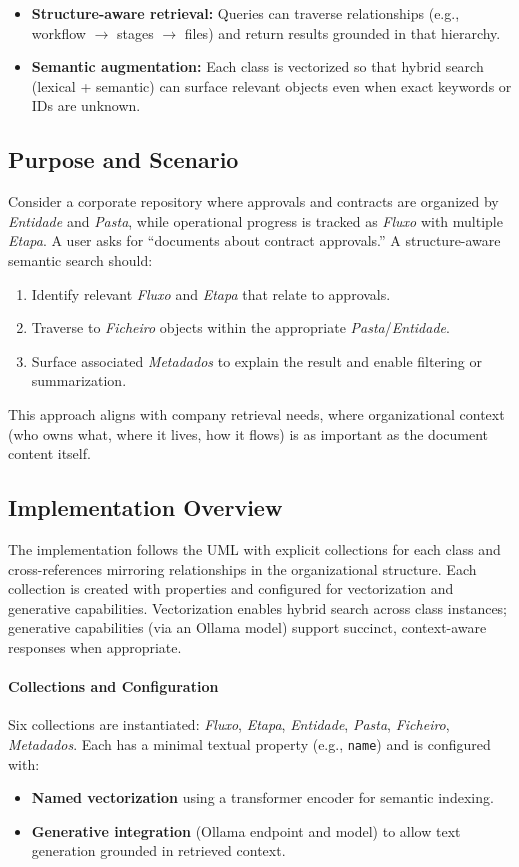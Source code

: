 \begin{itemize}
    \item \textbf{Structure-aware retrieval:} Queries can traverse relationships (e.g., workflow \(\rightarrow\) stages \(\rightarrow\) files) and return results grounded in that hierarchy.
    \item \textbf{Semantic augmentation:} Each class is vectorized so that hybrid search (lexical + semantic) can surface relevant objects even when exact keywords or IDs are unknown.
\end{itemize}

\subsection{Purpose and Scenario}
Consider a corporate repository where approvals and contracts are organized by \textit{Entidade} and \textit{Pasta}, while operational progress is tracked as \textit{Fluxo} with multiple \textit{Etapa}. A user asks for “documents about contract approvals.” A structure-aware semantic search should:
\begin{enumerate}
    \item Identify relevant \textit{Fluxo} and \textit{Etapa} that relate to approvals.
    \item Traverse to \textit{Ficheiro} objects within the appropriate \textit{Pasta}/\textit{Entidade}.
    \item Surface associated \textit{Metadados} to explain the result and enable filtering or summarization.
\end{enumerate}
This approach aligns with company retrieval needs, where organizational context (who owns what, where it lives, how it flows) is as important as the document content itself.

\subsection{Implementation Overview}
The implementation follows the UML with explicit collections for each class and cross-references mirroring relationships in the organizational structure. Each collection is created with properties and configured for vectorization and generative capabilities. Vectorization enables hybrid search across class instances; generative capabilities (via an Ollama model) support succinct, context-aware responses when appropriate.

\paragraph{Collections and Configuration}
Six collections are instantiated: \textit{Fluxo}, \textit{Etapa}, \textit{Entidade}, \textit{Pasta}, \textit{Ficheiro}, \textit{Metadados}. Each has a minimal textual property (e.g., \texttt{name}) and is configured with:
\begin{itemize}
    \item \textbf{Named vectorization} using a transformer encoder for semantic indexing.
    \item \textbf{Generative integration} (Ollama endpoint and model) to allow text generation grounded in retrieved context.
\end{itemize}

